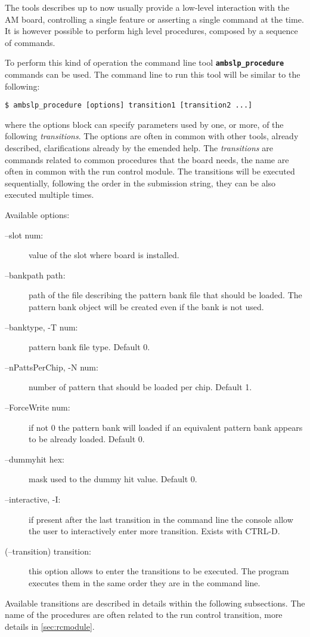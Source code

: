 The tools describes up to now usually provide a low-level
interaction with the AM board, controlling a single feature
or asserting a single command at the time. It is however 
possible to perform high level procedures, composed by a sequence
of commands.

To perform this kind of operation the command line tool
\textbf{\texttt{ambslp\_procedure}} commands can be used. The
command line to run this tool will be similar to the
following:
\begin{verbatim}
$ ambslp_procedure [options] transition1 [transition2 ...]
\end{verbatim}
where the options block can specify parameters used by one, or more,
of the following \emph{transitions}. The options are often in common
with other tools, already described, clarifications already by the emended help.
The \emph{transitions} are commands related to common procedures
that the board needs, the name are often in common with the
run control module. The transitions will be executed
sequentially, following the order in the submission string, they can 
be also executed multiple times.

Available options:
\begin{description}
\item[--slot num:] value of the slot where board is installed.

\item[--bankpath path:] path of the file describing the pattern bank file
that should be loaded. The pattern bank object will be created even if
the bank is not used.

\item[--banktype, -T num:] pattern bank file type. Default 0.

\item[--nPattsPerChip, -N num:] number of pattern that should be loaded
per chip. Default 1.

\item[--ForceWrite num:] if not 0 the pattern bank will loaded if an equivalent
pattern bank appears to be already loaded. Default 0.

\item[--dummyhit hex:] mask used to the dummy hit value. Default 0.

\item[--interactive, -I:] if present after the last transition in the command line the
console allow the user to interactively enter more transition. Exists with CTRL-D.

\item[(--transition) transition:] this option allows to enter the transitions to be
executed. The program executes them in the same order they are in the command line.
\end{description}
Available transitions are described in details within the following 
subsections. The name of the procedures are often related to the run
control transition, more details in \ref{sec:rcmodule}.

